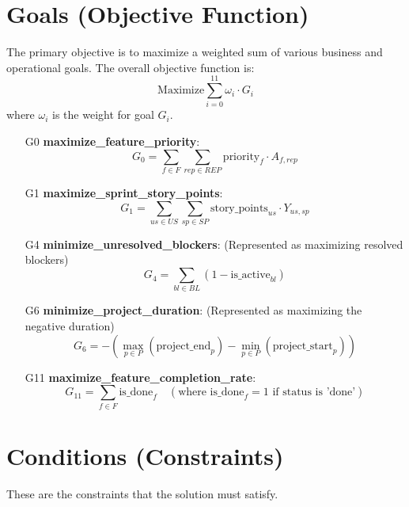 \documentclass[11pt]{article}
\begin{document}
\section{Goals (Objective Function)}
The primary objective is to maximize a weighted sum of various business and operational goals. The overall objective function is:
$$ \text{Maximize} \sum_{i=0}^{11} \omega_i \cdot G_i $$
where $\omega_i$ is the weight for goal $G_i$.

\begin{itemize}
    \item [G0] \textbf{maximize\_feature\_priority}:
    $$ G_0 = \sum_{f \in F} \sum_{rep \in REP} \text{priority}_f \cdot A_{f,rep} $$

    \item [G1] \textbf{maximize\_sprint\_story\_points}:
    $$ G_1 = \sum_{us \in US} \sum_{sp \in SP} \text{story\_points}_{us} \cdot Y_{us,sp} $$

    \item [G4] \textbf{minimize\_unresolved\_blockers}: (Represented as maximizing resolved blockers)
    $$ G_4 = \sum_{bl \in BL} (1 - \text{is\_active}_{bl}) $$

    \item [G6] \textbf{minimize\_project\_duration}: (Represented as maximizing the negative duration)
    $$ G_6 = -(\max_{p \in P}(\text{project\_end}_p) - \min_{p \in P}(\text{project\_start}_p)) $$
    
    \item [G11] \textbf{maximize\_feature\_completion\_rate}:
    $$ G_{11} = \sum_{f \in F} \text{is\_done}_f \quad (\text{where is\_done}_f=1 \text{ if status is 'done'}) $$
\end{itemize}

\section{Conditions (Constraints)}
These are the constraints that the solution must satisfy.
\end{document}
